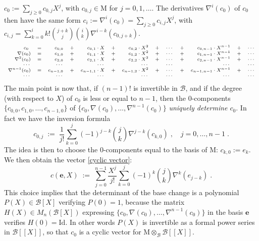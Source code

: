 \documentclass{compositio}
\numberwithin{equation}{section}
\begin{document}
$c_0:=\sum_{j\geq 0}c_{0,j} X^j$, with $c_{0,j}\in{\mathrm{M}}$ for $j=0,1,\ldots$. 
The derivatives $\nabla^i(c_0)$ of $c_0$ then have the same form $c_i:=\nabla^i(c_0)=
\sum_{j\geq 0}c_{i,j}X^j$, with $c_{i,j}=\sum_{k=0}^ik!\binom{j+k}{j}\binom{i}{k}\nabla^{i-k}(c_{0,j+k})$. 
\begin{equation}
\begin{scriptsize}
\begin{array}{rlrrrrrrrrrrr}
c_0\phantom{)}&=&c_{0,0}&+&c_{0,1}\cdot X&+&c_{0,2}\cdot 
X^2&+&\cdots&+&c_{0,n-1}\cdot X^{n-1}&+&\cdots\\
\nabla(c_0)&=&c_{1,0}&+&c_{1,1}\cdot X&+&c_{1,2}\cdot X^2&+&\cdots&+&c_{1,n-1}\cdot X^{n-1}&+&\cdots\\
\nabla^2(c_0)&=&c_{2,0}&+&c_{2,1}\cdot X&+&c_{2,2}\cdot X^2&+&\cdots&+&c_{2,n-1}\cdot X^{n-1}&+&\cdots\\
\cdots&&\cdots&&\cdots&&\cdots&&\cdots&&\cdots&&\cdots\\
\nabla^{n-1}(c_0)&=&c_{n-1,0}&+&c_{n-1,1}\cdot X&+&c_{n-1,2}\cdot X^2&+&\cdots&+&c_{n-1,n-1}\cdot 
X^{n-1}&+&\cdots\\
\cdots&&\cdots&&\cdots&&\cdots&&\cdots&&\cdots&&\cdots
\end{array}
\end{scriptsize}\end{equation}
The main point is now that, if $(n-1)!$ is invertible in ${\mathscr{B}}$, and if the degree (with respect to $X$) of $c_0$ 
is less or equal to $n-1$, 
then the $0$-components $\{c_{0,0},c_{1,0},\ldots,c_{n-1,0}\}$ of $\{c_0,\nabla(c_0),\ldots,\nabla^{n-1}(c_0)\}$ 
\emph{uniquely determine $c_0$}. In fact we have the inversion formula 
\begin{equation}
c_{0,j}\;:=\;\frac{1}{j!}\sum_{k=0}^j(-1)^{j-k}\binom{j}{k}\nabla^{j-k}(c_{k,0})\;,\quad j=0,\ldots,n-1\;.
\end{equation}
The idea is then to choose the $0$-components equal to the basis of ${\mathrm{M}}$: $c_{k,0}:=e_k$. 
We then obtain the vector \eqref{cyclic vector}:
\begin{equation}
c({\mathbf{e}},X)\;:=\;\sum_{j=0}^{n-1}\frac{X^j}{j!}\sum_{k=0}^j(-1)^k\binom{j}{k}\nabla^k(e_{j-k})\;.
\end{equation}
 This choice implies that the determinant of the base change 
is a polynomial $P(X)\in{\mathscr{B}}[X]$ verifying $P(0)=1$, because the matrix $H(X)\in M_n({\mathscr{B}}[X])$ 
expressing $\{c_0,\nabla(c_0),\ldots,\nabla^{n-1}(c_0)\}$ in the basis ${\mathbf{e}}$ verifies $H(0)=\mathrm{Id}$. 
In other words $P(X)$ is invertible as a formal power series in ${\mathscr{B}}[[X]]$, so that $c_0$ is a cyclic 
vector for ${\mathrm{M}}\otimes_{\mathscr{B}}{\mathscr{B}}[[X]]$.
\end{document}
